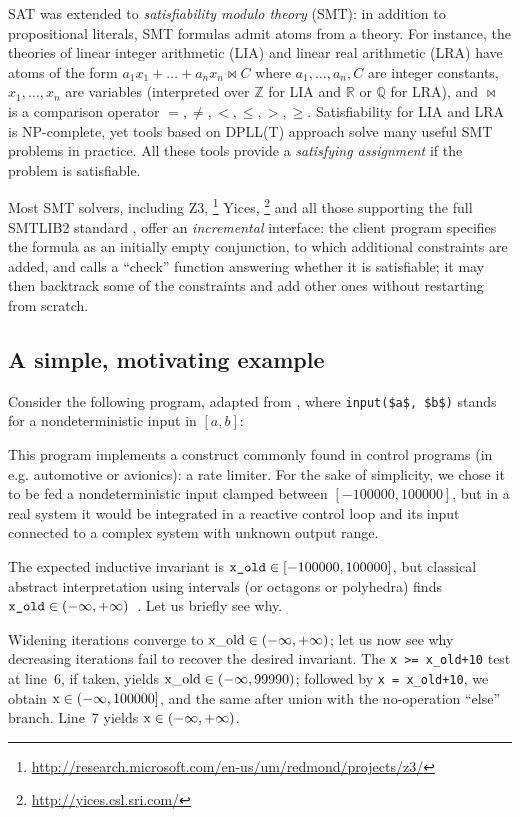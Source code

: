 \documentclass[preprint]{sigplanconf}
\newcommand{\ZZ}{\mathbb{Z}}
\newcommand{\QQ}{\mathbb{Q}}
\newcommand{\RR}{\mathbb{R}}
\begin{document}
SAT was extended to \emph{satisfiability modulo theory} (SMT): in addition to propositional literals, SMT formulas admit atoms from a theory.
For instance, the theories of linear integer arithmetic (LIA) and linear real arithmetic (LRA) have atoms of the form $a_1 x_1 + \dots + a_n x_n \bowtie C$ where $a_1,\dots,a_n,C$ are integer constants, $x_1,\dots,x_n$ are variables (interpreted over $\ZZ$ for LIA and $\RR$ or $\QQ$ for LRA), and $\bowtie$ is a comparison operator $=,\neq,<,\leq,>,\geq$.
Satisfiability for LIA and LRA is NP-complete, yet tools based on DPLL(T) approach \cite{Kroening_Strichman_08,Handbook_SAT} solve many useful SMT problems in practice. All these tools provide a \emph{satisfying assignment} if the problem is satisfiable.

Most SMT solvers, including Z3,%
\footnote{\url{http://research.microsoft.com/en-us/um/redmond/projects/z3/}}
Yices,%
\footnote{\url{http://yices.csl.sri.com/}}
and all those supporting the full SMTLIB2 standard \cite{BarST-SMTLIB},
offer an \emph{incremental} interface: the client program specifies the formula as an initially empty conjunction, to which additional constraints are added, and calls a ``check'' function answering whether it is satisfiable; 
it may then backtrack some of the constraints and add other ones without restarting from scratch.

\subsection{A simple, motivating example}
\label{subsec:rate_lim}
Consider the following program, adapted from \cite{Monniaux_Gonnord_SAS11}, where \lstinline|input($a$, $b$)| stands for a nondeterministic input in $[a,b]$:

This program implements a construct commonly found in control programs (in e.g. automotive or avionics): a rate limiter. For the sake of simplicity, we chose it to be fed a nondeterministic input clamped between $[-100000,100000]$, but in a real system it would be integrated in a reactive control loop and its input connected to a complex system with unknown output range.

The expected inductive invariant is $\verb|x_old| \in [-100000,100000]$, but classical abstract interpretation using intervals (or octagons or polyhedra) finds $\verb|x_old| \in (-\infty,+\infty)$~\citep{ASTREE_ESOP05}.
Let us briefly see why.

Widening iterations converge to $\lstinline|x_old| \in (-\infty,+\infty)$; let us now see why decreasing iterations fail to recover the desired invariant.
The \lstinline|x >= x_old+10| test at line~6, if taken, yields $\lstinline|x_old| \in (-\infty,99990)$; followed by \lstinline|x = x_old+10|, we obtain $\lstinline|x| \in (-\infty,\allowbreak 100000]$, and the same after union with the no-operation ``else'' branch. Line~7 yields $\lstinline|x| \in (-\infty,+\infty)$.
\end{document}
